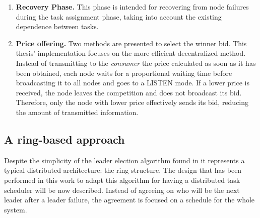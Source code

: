 \begin{enumerate}

\item \textbf{Recovery Phase. } This phase is intended for recovering from node failures during the task assignment phase, taking into account the existing dependence between tasks.

\item \textbf{Price offering. } Two methods are presented to select the winner bid. This thesis' implementation focuses on the more efficient decentralized method. Instead of transmitting to the \emph{consumer} the price calculated as soon as it has been obtained, each node waits for a proportional waiting time before broadcasting it to all nodes and goes to a LISTEN mode. If a lower price is received, the node leaves the competition and does not broadcast its bid. Therefore, only the node with lower price effectively sends its bid, reducing the amount of transmitted information.
\end{enumerate}


\subsection{A ring-based approach}
Despite the simplicity of the leader election algorithm found in \cite{Tanenbaum:2006:DSP:1202502} it represents a typical distributed architecture: the ring structure. The design that has been performed in this work to adapt this algorithm for having a distributed task scheduler will be now described. Instead of agreeing on who will be the next leader after a leader failure, the agreement is focused on a schedule for the whole system.

